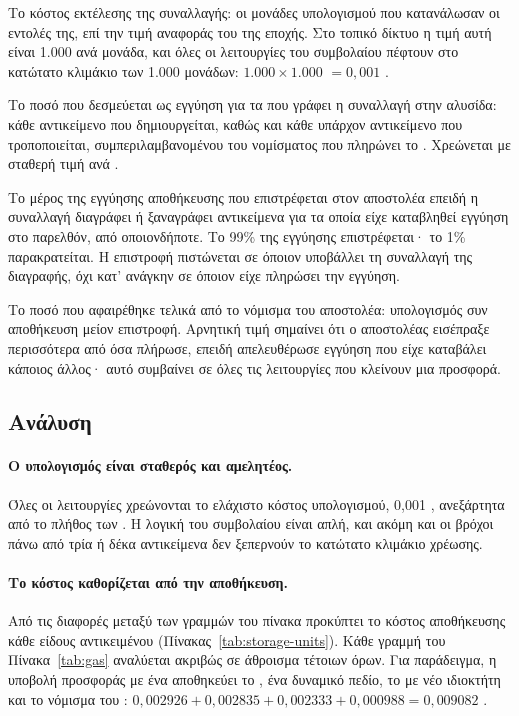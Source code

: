 \begin{description}[leftmargin=1.2em,itemsep=2pt]
  \item[Υπολογισμός.] Το κόστος εκτέλεσης της συναλλαγής: οι μονάδες υπολογισμού που
    κατανάλωσαν οι εντολές της, επί την τιμή αναφοράς του  της εποχής. Στο τοπικό
    δίκτυο η τιμή αυτή είναι 1.000  ανά μονάδα, και όλες οι λειτουργίες του
    συμβολαίου πέφτουν στο κατώτατο κλιμάκιο των 1.000 μονάδων: $1.000 \times 1.000$
     $= 0{,}001$ .
  \item[Αποθήκευση.] Το ποσό που δεσμεύεται ως εγγύηση για τα  που γράφει η
    συναλλαγή στην αλυσίδα: κάθε αντικείμενο που δημιουργείται, καθώς και κάθε υπάρχον
    αντικείμενο που τροποποιείται, συμπεριλαμβανομένου του νομίσματος που πληρώνει το
    . Χρεώνεται με σταθερή τιμή ανά .
  \item[Επιστροφή.] Το μέρος της εγγύησης αποθήκευσης που επιστρέφεται στον αποστολέα
    επειδή η συναλλαγή διαγράφει ή ξαναγράφει αντικείμενα για τα οποία είχε καταβληθεί
    εγγύηση στο παρελθόν, από οποιονδήποτε. Το 99\% της εγγύησης επιστρέφεται· το 1\%
    παρακρατείται. Η επιστροφή πιστώνεται σε όποιον υποβάλλει τη συναλλαγή της
    διαγραφής, όχι κατ' ανάγκην σε όποιον είχε πληρώσει την εγγύηση.
  \item[Καθαρό.] Το ποσό που αφαιρέθηκε τελικά από το νόμισμα  του αποστολέα:
    υπολογισμός συν αποθήκευση μείον επιστροφή. Αρνητική τιμή σημαίνει ότι ο αποστολέας
    εισέπραξε περισσότερα από όσα πλήρωσε, επειδή απελευθέρωσε εγγύηση που είχε καταβάλει
    κάποιος άλλος· αυτό συμβαίνει σε όλες τις λειτουργίες που κλείνουν μια προσφορά.
\end{description}

\subsection{Ανάλυση}

\paragraph{Ο υπολογισμός είναι σταθερός και αμελητέος.} Όλες οι λειτουργίες χρεώνονται το
ελάχιστο κόστος υπολογισμού, 0{,}001 , ανεξάρτητα από το πλήθος των . Η
λογική του συμβολαίου είναι απλή, και ακόμη και οι βρόχοι πάνω από τρία ή δέκα αντικείμενα
δεν ξεπερνούν το κατώτατο κλιμάκιο χρέωσης.

\paragraph{Το κόστος καθορίζεται από την αποθήκευση.} Από τις διαφορές μεταξύ των γραμμών
του πίνακα προκύπτει το κόστος αποθήκευσης κάθε είδους αντικειμένου
(Πίνακας~\ref{tab:storage-units}). Κάθε γραμμή του Πίνακα~\ref{tab:gas} αναλύεται ακριβώς
σε άθροισμα τέτοιων όρων. Για παράδειγμα, η υποβολή προσφοράς με ένα  αποθηκεύει
το , ένα δυναμικό πεδίο, το  με νέο ιδιοκτήτη και το νόμισμα του :
$0{,}002926 + 0{,}002835 + 0{,}002333 + 0{,}000988 = 0{,}009082$ .


